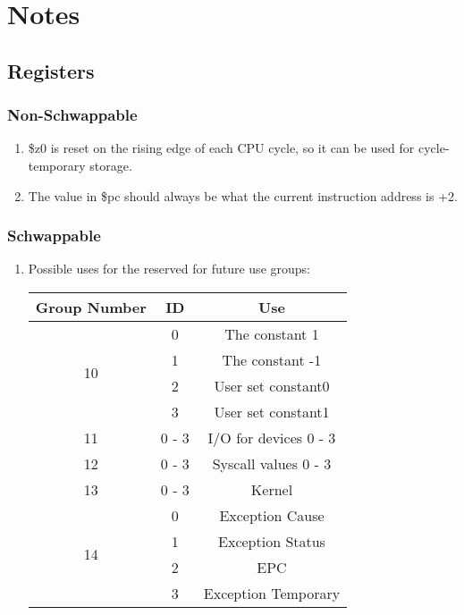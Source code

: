 \documentclass{article}
\begin{document}
\section{Notes}
	\subsection{Registers}
		\subsubsection{Non-Schwappable}
			\begin{enumerate}
				\item \$z0 is reset on the rising edge of each CPU cycle, so it can be used for cycle-temporary storage.
				\item The value in \$pc should always be what the current instruction address is +2.
			\end{enumerate}
		\subsubsection{Schwappable}
			\begin{enumerate}
				\item Possible uses for the reserved for future use groups:
					\begin{center} \begin{tabular}{| c | c | c |} \hline
						Group Number & ID    & Use \\ \hline
						\multirow{4}{*}{10}  & 0 & The constant 1 \\
						             & 1     & The constant -1 \\
						             & 2     & User set constant0 \\
						             & 3     & User set constant1 \\ \hline
						11           & 0 - 3 & I/O for devices 0 - 3 \\ \hline
						12           & 0 - 3 & Syscall values 0 - 3 \\ \hline
						13           & 0 - 3 & Kernel \\ \hline
						\multirow{4}{*}{14}  & 0 & Exception Cause \\
						             & 1     & Exception Status \\
						             & 2     & EPC \\
						             & 3     & Exception Temporary \\ \hline
					\end{tabular} \end{center} 
			\end{enumerate}
\end{document}
